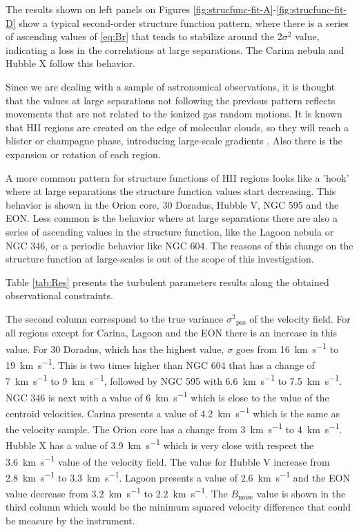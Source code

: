 \documentclass[fleqn,usenatbib, useAMS, a4paper]{mnras}
\newcommand\pos{\ensuremath{_{\mathrm{pos}}}}
\begin{document}
The results shown on left panels on Figures \ref{fig:strucfunc-fit-A}-\ref{fig:strucfunc-fit-D} show a typical second-order structure function pattern, where there is a series of ascending values of  \ref{eq:Br} that tends to stabilize around the 2\(\sigma^2\) value, indicating a loss in the correlations at large separations. 
The Carina nebula and Hubble X follow this behavior.

Since we are dealing with a sample of astronomical observations, it is thought that the values at large separations not following the previous pattern reflects movements that are not related to the ionized gas random motions.
It is known that HII regions are created on the edge of molecular clouds, so they will reach a blister or champagne phase, introducing large-scale gradients \citep{Mivi1995}. 
Also there is the expansion or rotation of each region.

A more common pattern for structure functions of HII regions looks like a 'hook' where at large separations the structure function values start decreasing.
This behavior is shown in the Orion core, 30 Doradus, Hubble V, NGC 595 and the EON.
Less common is the behavior where at large separations there are also a series of ascending values in the structure function, like the Lagoon nebula or NGC 346, or a periodic behavior like NGC 604.
The reasons of this change on the structure function at large-scales is out of the scope of this investigation.

Table \ref{tab:Res} presents the turbulent parameters results along the obtained observational constraints.

The second column correspond to the true variance \(\sigma^2\pos\) of the velocity field.
For all regions except for Carina, Lagoon and the EON there is an increase in this value.
For 30 Doradus, which has the highest value, \(\sigma\) goes from \SI{16}{km.s^{-1}} to  \SI{19}{km.s^{-1}}.
This is two times higher than NGC 604 that has a change of \SI{7}{km.s^{-1}} to \SI{9}{km.s^{-1}}, followed by NGC 595 with \SI{6.6}{km.s^{-1}} to \SI{7.5}{km.s^{-1}}.
NGC 346 is next with a value of \SI{6}{km.s^{-1}} which is close to the value of the centroid velocities.
Carina presents a value of \SI{4.2}{km.s^{-1}} which is the same as the velocity sample.
The Orion core has a change from \SI{3}{km.s^{-1}} to \SI{4}{km.s^{-1}}.
Hubble X has a value of \SI{3.9}{km.s^{-1}} which is very close with respect the \SI{3.6}{km.s^{-1}} value of the velocity field.
The value for Hubble V increase from \SI{2.8}{km.s^{-1}} to \SI{3.3}{km.s^{-1}}.
Lagoon presents a value of \SI{2.6}{km.s^{-1}} and the EON value decrease from \SI{3.2}{km.s^{-1}} to \SI{2.2}{km.s^{-1}}.
The \(B_{\text{noise}}\) value is shown in the third column which would be the minimum squared velocity difference that could be measure by the instrument.
\end{document}

